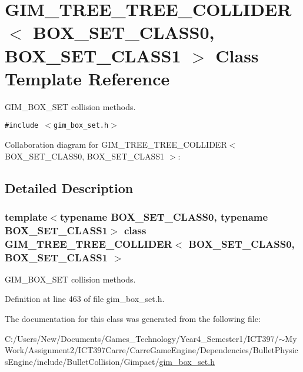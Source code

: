 \hypertarget{class_g_i_m___t_r_e_e___t_r_e_e___c_o_l_l_i_d_e_r}{
\section{GIM\_\-TREE\_\-TREE\_\-COLLIDER$<$ BOX\_\-SET\_\-CLASS0, BOX\_\-SET\_\-CLASS1 $>$ Class Template Reference}
\label{class_g_i_m___t_r_e_e___t_r_e_e___c_o_l_l_i_d_e_r}
}
GIM\_\-BOX\_\-SET collision methods.  


{\tt \#include $<$gim\_\-box\_\-set.h$>$}

Collaboration diagram for GIM\_\-TREE\_\-TREE\_\-COLLIDER$<$ BOX\_\-SET\_\-CLASS0, BOX\_\-SET\_\-CLASS1 $>$:

\subsection{Detailed Description}
\subsubsection*{template$<$typename BOX\_\-SET\_\-CLASS0, typename BOX\_\-SET\_\-CLASS1$>$ class GIM\_\-TREE\_\-TREE\_\-COLLIDER$<$ BOX\_\-SET\_\-CLASS0, BOX\_\-SET\_\-CLASS1 $>$}

GIM\_\-BOX\_\-SET collision methods. 

Definition at line 463 of file gim\_\-box\_\-set.h.

The documentation for this class was generated from the following file:\begin{CompactItemize}
\item 
C:/Users/New/Documents/Games\_\-Technology/Year4\_\-Semester1/ICT397/$\sim$My Work/Assignment2/ICT397Carre/CarreGameEngine/Dependencies/BulletPhysicsEngine/include/BulletCollision/Gimpact/\hyperlink{gim__box__set_8h}{gim\_\-box\_\-set.h}\end{CompactItemize}
